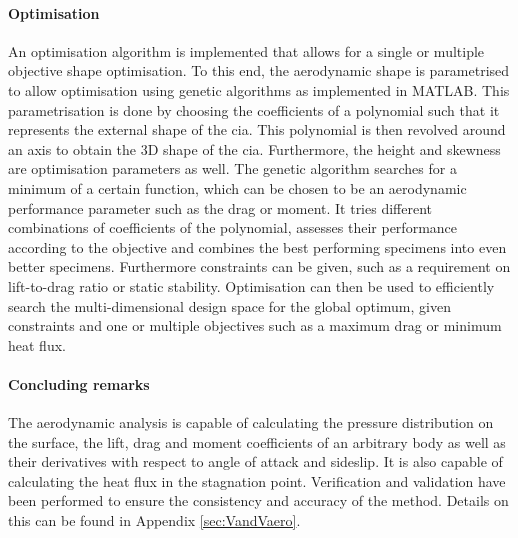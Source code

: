 \paragraph{Optimisation} \label{par:Optimisation}
An optimisation algorithm is implemented that allows for a single or multiple objective shape optimisation. To this end, the aerodynamic shape is parametrised to allow optimisation using genetic algorithms as implemented in MATLAB. This parametrisation is done by choosing the coefficients of a polynomial such that it represents the external shape of the \gls{cia}. This polynomial is then revolved around an axis to obtain the 3D shape of the \gls{cia}. Furthermore, the height and skewness are optimisation parameters as well. The genetic algorithm searches for a minimum of a certain function, which can be chosen to be an aerodynamic performance parameter such as the drag or moment. It tries different combinations of coefficients of the polynomial, assesses their performance according to the objective and combines the best performing specimens into even better specimens. Furthermore constraints can be given, such as a requirement on lift-to-drag ratio or static stability. Optimisation can then be used to efficiently search the multi-dimensional design space for the global optimum, given constraints and one or multiple objectives such as a maximum drag or minimum heat flux.

\paragraph{Concluding remarks}
The aerodynamic analysis is capable of calculating the pressure distribution on the surface, the lift, drag and moment coefficients of an arbitrary body as well as their derivatives with respect to angle of attack and sideslip. It is also capable of calculating the heat flux in the stagnation point. Verification and validation have been performed to ensure the consistency and accuracy of the method. Details on this can be found in Appendix \ref{sec:VandVaero}.